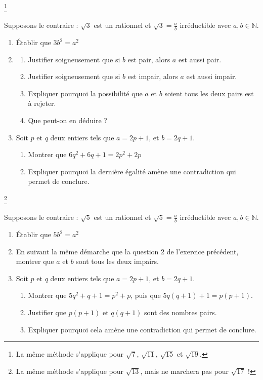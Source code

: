 \begin{exercise}\footnote{La même méthode s'applique pour $\sqrt{7}$, $\sqrt{11}$, $\sqrt{15}$ et $\sqrt{19}$.}\hfill 
	
Supposons le contraire : $\sqrt{3}$ est un rationnel et $\sqrt{3}=\frac{a}{b}$ irréductible avec $a, b\in\mathbb{N}$.
\begin{enumerate}[label={\arabic*)},leftmargin=*]
	\item Établir que $3b^2=a^2$
	\item
	\begin{enumerate}[label={\alph*)},leftmargin=*]  
		\item Justifier soigneusement que si $b$ est pair, alors $a$ est aussi pair.
		\item Justifier soigneusement que si $b$ est impair, alors $a$ est aussi impair.
		\item Expliquer pourquoi la possibilité que $a$ et $b$ soient tous les deux pairs est à rejeter.
		\item Que peut-on en déduire ?
	\end{enumerate}
	\item Soit $p$ et $q$ deux entiers tels que $a=2p+1$, et $b=2q+1$.
	\begin{enumerate}[label={\alph*)},leftmargin=*] 
		\item Montrer que $6q^2+6q+1=2p^2+2p$
		\item Expliquer pourquoi la dernière égalité amène une contradiction qui permet de conclure.
	\end{enumerate}
\end{enumerate} 
\end{exercise} 
\vfill 
\begin{exercise}\footnote{La même méthode s'applique pour $\sqrt{13}$, mais ne marchera pas pour $\sqrt{17}$ !}\hfill 
	
Supposons le contraire : $\sqrt{5}$ est un rationnel et $\sqrt{5}=\frac{a}{b}$ irréductible avec $a, b\in\mathbb{N}$.
\begin{enumerate}[label={\arabic*)},leftmargin=*]
	\item Établir que $5b^2=a^2$
	\item  En suivant la même démarche que la question 2 de l'exercice précédent, montrer que $a$ et $b$ sont tous les deux impairs.
	\item Soit $p$ et $q$ deux entiers tels que $a=2p+1$, et $b=2q+1$.
	\begin{enumerate}[label={\alph*)},leftmargin=*] 
		\item Montrer que $5q^2+q+1=p^2+p$, puis que $5q(q+1)+1=p(p+1)$.
		\item Justifier que $p(p+1)$ et $q(q+1)$ sont des nombres pairs.
		\item Expliquer pourquoi cela amène une contradiction qui permet de conclure.
	\end{enumerate}
\end{enumerate} 
\end{exercise} 
